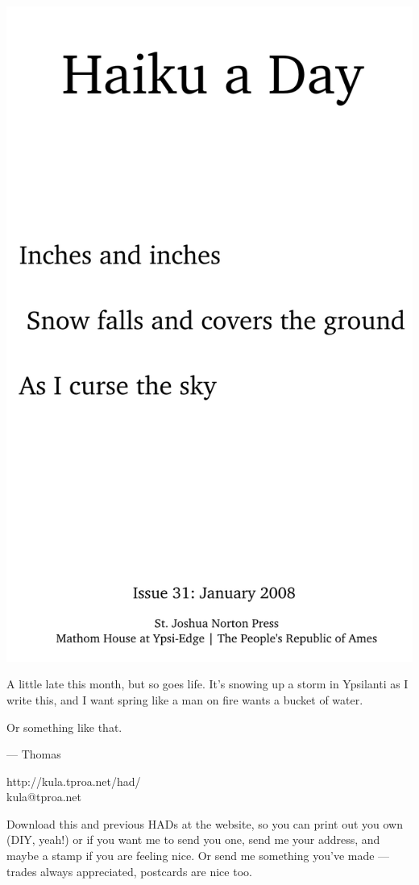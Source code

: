 \documentclass[12pt]{article}
\begin{document}
\includegraphics{frontpage.png}

\newpage

A little late this month, but so goes life. It's
snowing up a storm in Ypsilanti as I write this,
and I want spring like a man on fire wants a 
bucket of water.

Or something like that.


--- Thomas

http://kula.tproa.net/had/ \\
kula@tproa.net

Download this and previous HADs at the website, so you can
print out you own (DIY, yeah!) or if you want me to send
you one, send me your address, and maybe a stamp if you
are feeling nice. Or send me something you've made ---
trades always appreciated, postcards are nice too.
\end{document}
